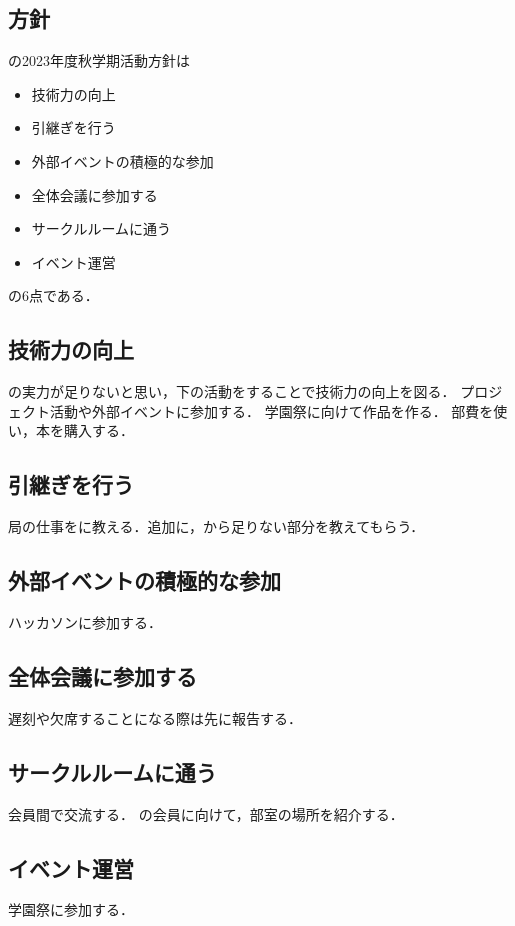 \subsection*{\newGradeIfKouki{}\secondGrade{}方針}


\secondGrade{}の2023年度秋学期活動方針は
\begin{itemize}
    \item 技術力の向上
    \item 引継ぎを行う
    \item 外部イベントの積極的な参加
    \item 全体会議に参加する
    \item サークルルームに通う
    \item イベント運営
\end{itemize}
の6点である．

\subsection*{技術力の向上}
\secondGrade{}の実力が足りないと思い，下の活動をすることで技術力の向上を図る．
プロジェクト活動や外部イベントに参加する．
学園祭に向けて作品を作る．
部費を使い，本を購入する．

\subsection*{引継ぎを行う}
局の仕事を\firstGrade{}に教える．追加に，\thirdGrade{}から足りない部分を教えてもらう．

\subsection*{外部イベントの積極的な参加}
ハッカソンに参加する．

\subsection*{全体会議に参加する}
遅刻や欠席することになる際は先に報告する．

\subsection*{サークルルームに通う}
会員間で交流する．
\firstGrade{}の会員に向けて，部室の場所を紹介する．

\subsection*{イベント運営}
学園祭に参加する．
